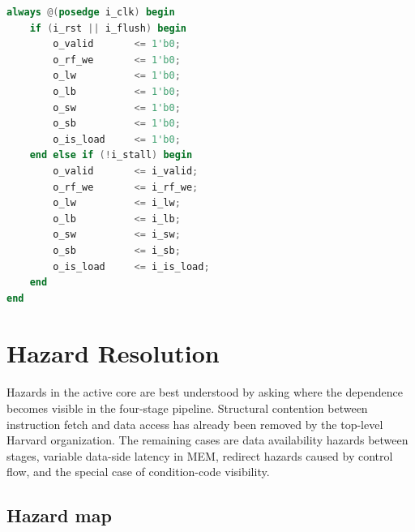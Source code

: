 \documentclass[11pt,a4paper]{article}
\begin{document}
\begin{lstlisting}[language=Verilog,caption={EX/MEM storage behavior in \texttt{srcs/m\_pipe\_ex\_mem.v}}]
always @(posedge i_clk) begin
    if (i_rst || i_flush) begin
        o_valid       <= 1'b0;
        o_rf_we       <= 1'b0;
        o_lw          <= 1'b0;
        o_lb          <= 1'b0;
        o_sw          <= 1'b0;
        o_sb          <= 1'b0;
        o_is_load     <= 1'b0;
    end else if (!i_stall) begin
        o_valid       <= i_valid;
        o_rf_we       <= i_rf_we;
        o_lw          <= i_lw;
        o_lb          <= i_lb;
        o_sw          <= i_sw;
        o_sb          <= i_sb;
        o_is_load     <= i_is_load;
    end
end
\end{lstlisting}

\section{Hazard Resolution}

Hazards in the active core are best understood by asking where the dependence becomes visible in the four-stage pipeline. Structural contention between instruction fetch and data access has already been removed by the top-level Harvard organization. The remaining cases are data availability hazards between stages, variable data-side latency in MEM, redirect hazards caused by control flow, and the special case of condition-code visibility.

\subsection{Hazard map}
\end{document}
